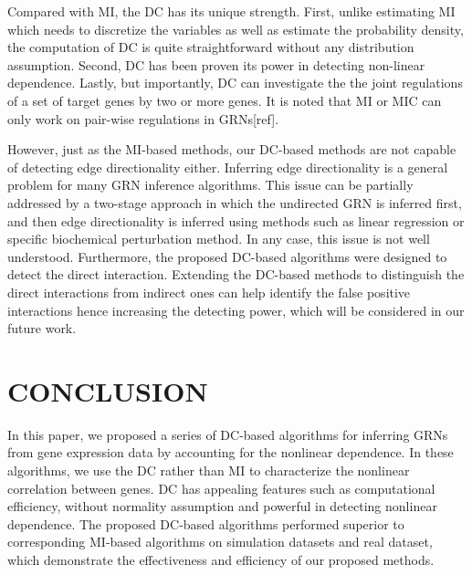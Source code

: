 \documentclass{bioinfo}
\begin{document}
Compared with MI, the DC has its unique strength. First, unlike
estimating MI which needs to discretize the variables as well as
estimate the probability density, the computation of DC is quite
straightforward without any distribution assumption. Second, DC has
been proven its power in detecting non-linear dependence. Lastly,
but importantly, DC can investigate the the joint regulations of a
set of target genes by two or more genes. It is noted that MI or MIC
can only work on pair-wise regulations in GRNs[ref].

However, just as the MI-based methods, our DC-based methods are not
capable of detecting edge directionality either. Inferring edge
directionality is a general problem for many GRN inference
algorithms. This issue can be partially addressed by a two-stage
approach in which the undirected GRN is inferred first, and then
edge directionality is inferred using methods such as linear
regression or specific biochemical perturbation
method\citep{carrera2009model,margolin2006reverse}. In any case,
this issue is not well understood. Furthermore, the proposed
DC-based algorithms were designed to detect the direct interaction.
Extending the DC-based methods to distinguish the direct
interactions from indirect ones can help identify the false positive
interactions hence increasing the detecting power, which will be
considered in our future work.


\section{CONCLUSION}
In this paper, we proposed a series of DC-based algorithms for
inferring GRNs from gene expression data by accounting for the
nonlinear dependence.  In these algorithms, we use the DC rather
than MI to characterize the nonlinear correlation between genes. DC
has appealing features such as computational efficiency, without
normality assumption and powerful in detecting nonlinear dependence.
The proposed DC-based algorithms performed superior to corresponding
MI-based algorithms on simulation datasets and real dataset, which
demonstrate the effectiveness and efficiency of our proposed
methods.


%
%
%
%
%
%


\end{document}

